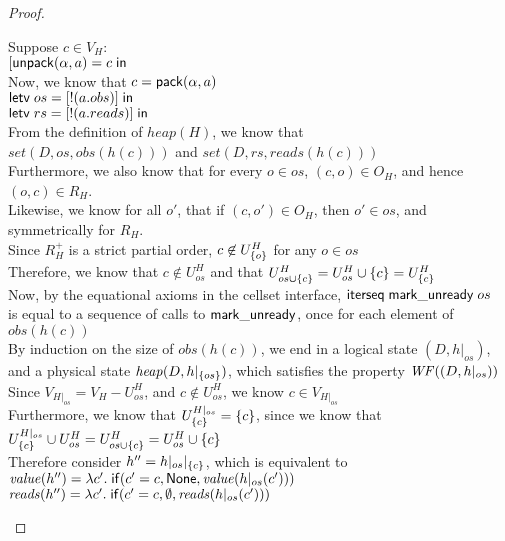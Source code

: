 \begin{proof}
\begin{tabbedproof}
\ooo Suppose $c \in V_H$: \\
\oooo $[\mathsf{unpack}({\alpha}, {a}) = {c} \;\mathsf{in}\;{}$ \\
\oooo Now, we know that $c = \mathsf{pack}({\alpha}, {a})$ \\
\oooo $\mathsf{letv}\;os = [!(a.obs)]\;\mathsf{in}\;$ \\
\oooo $\mathsf{letv}\;rs = [!(a.reads)]\;\mathsf{in}\;$ \\
\oooo From the definition of $\mathit{heap}(H)$, we know that  \\
\oooo $\mathit{set}(D, os, \mathit{obs}(h(c)))$ and $\mathit{set}(D, rs, \mathit{reads}(h(c)))$ \\
\oooo Furthermore, we also know that for every $o \in os$, $(c, o) \in O_H$, and hence $(o, c) \in R_H$. \\
\oooo Likewise, we know for all $o'$, that if $(c, o') \in O_H$, then $o' \in os$, and symmetrically for $R_H$. \\ 
\oooo Since $R^+_H$ is a strict partial order, $c \not \in U^H_{\{{o}\}}$ for any $o \in os$ \\
\oooo Therefore, we know that $c \not\in U^H_{os}$ and that $U^H_{os \cup \{{c}\}} = U^H_{os} \cup \{{c}\} = U^H_{\{{c}\}}$ \\
\oooo Now, by the equational axioms in the cellset interface, $\mathsf{iterseq\;mark\_unready}\;os$ \\
\ooox is equal to a sequence of calls to $\mathsf{mark\_unready}$, once for each element of $\mathit{obs}(h(c))$\\
\oooo By induction on the size of $\mathit{obs}(h(c))$, we end in a logical state $(D, h|_{os})$, \\
\ooox and a physical state $\mathit{heap}(D, h|_{\{{os}\}})$, which  satisfies the property $\mathit{WF}((D,h|_{os}))$\\
\oooo Since $V_{H|_{os}} = V_H - U^H_{os}$, and $c \not \in U^H_{os}$, we know $c \in V_{H|_{os}}$ \\ 
\oooo Furthermore, we know that $U^{H|_{os}}_{\{{c}\}} = \{{c}\}$, since we know that \\
\oooox $U^{H|_{os}}_{\{{c}\}} \cup U^H_{os} = U^H_{os \cup \{{c}\}} = U^H_{os} \cup \{{c}\}$ \\
\oooo Therefore consider $h'' = h|_{os}|_{\{{c}\}}$, which is equivalent to  \\
\oooox $\mathit{value}(h'') = \lambda c'.\;\mathsf{if}({c' = c}, {\mathsf{None}}, {\mathit{value}(h|_{os}(c'))})$ \\
\oooox $\mathit{reads}(h'') = \lambda c'.\;\mathsf{if}({c' = c}, {\emptyset}, {\mathit{reads}(h|_{os}(c'))})$ \\

\end{tabbedproof}
\end{proof}
